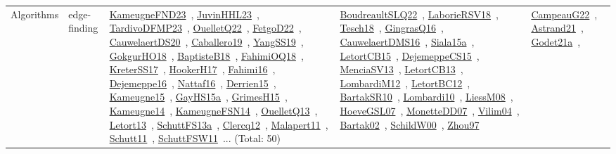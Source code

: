 {\begin{longtable}{lp{3cm}>{\raggedright\arraybackslash}p{6cm}>{\raggedright\arraybackslash}p{6cm}>{\raggedright\arraybackslash}p{8cm}}
Algorithms & edge-finding & \href{works/KameugneFND23.pdf}{KameugneFND23}~\cite{KameugneFND23}, \href{works/JuvinHHL23.pdf}{JuvinHHL23}~\cite{JuvinHHL23}, \href{works/TardivoDFMP23.pdf}{TardivoDFMP23}~\cite{TardivoDFMP23}, \href{works/OuelletQ22.pdf}{OuelletQ22}~\cite{OuelletQ22}, \href{works/FetgoD22.pdf}{FetgoD22}~\cite{FetgoD22}, \href{works/CauwelaertDS20.pdf}{CauwelaertDS20}~\cite{CauwelaertDS20}, \href{works/Caballero19.pdf}{Caballero19}~\cite{Caballero19}, \href{works/YangSS19.pdf}{YangSS19}~\cite{YangSS19}, \href{works/GokgurHO18.pdf}{GokgurHO18}~\cite{GokgurHO18}, \href{works/BaptisteB18.pdf}{BaptisteB18}~\cite{BaptisteB18}, \href{works/FahimiOQ18.pdf}{FahimiOQ18}~\cite{FahimiOQ18}, \href{works/KreterSS17.pdf}{KreterSS17}~\cite{KreterSS17}, \href{works/HookerH17.pdf}{HookerH17}~\cite{HookerH17}, \href{works/Fahimi16.pdf}{Fahimi16}~\cite{Fahimi16}, \href{works/Dejemeppe16.pdf}{Dejemeppe16}~\cite{Dejemeppe16}, \href{works/Nattaf16.pdf}{Nattaf16}~\cite{Nattaf16}, \href{works/Derrien15.pdf}{Derrien15}~\cite{Derrien15}, \href{works/Kameugne15.pdf}{Kameugne15}~\cite{Kameugne15}, \href{works/GayHS15a.pdf}{GayHS15a}~\cite{GayHS15a}, \href{works/GrimesH15.pdf}{GrimesH15}~\cite{GrimesH15}, \href{works/Kameugne14.pdf}{Kameugne14}~\cite{Kameugne14}, \href{works/KameugneFSN14.pdf}{KameugneFSN14}~\cite{KameugneFSN14}, \href{works/OuelletQ13.pdf}{OuelletQ13}~\cite{OuelletQ13}, \href{works/Letort13.pdf}{Letort13}~\cite{Letort13}, \href{works/SchuttFS13a.pdf}{SchuttFS13a}~\cite{SchuttFS13a}, \href{works/Clercq12.pdf}{Clercq12}~\cite{Clercq12}, \href{works/Malapert11.pdf}{Malapert11}~\cite{Malapert11}, \href{works/Schutt11.pdf}{Schutt11}~\cite{Schutt11}, \href{works/SchuttFSW11.pdf}{SchuttFSW11}~\cite{SchuttFSW11}... (Total: 50) & \href{works/BoudreaultSLQ22.pdf}{BoudreaultSLQ22}~\cite{BoudreaultSLQ22}, \href{works/LaborieRSV18.pdf}{LaborieRSV18}~\cite{LaborieRSV18}, \href{works/Tesch18.pdf}{Tesch18}~\cite{Tesch18}, \href{works/GingrasQ16.pdf}{GingrasQ16}~\cite{GingrasQ16}, \href{works/CauwelaertDMS16.pdf}{CauwelaertDMS16}~\cite{CauwelaertDMS16}, \href{works/Siala15a.pdf}{Siala15a}~\cite{Siala15a}, \href{works/LetortCB15.pdf}{LetortCB15}~\cite{LetortCB15}, \href{works/DejemeppeCS15.pdf}{DejemeppeCS15}~\cite{DejemeppeCS15}, \href{works/MenciaSV13.pdf}{MenciaSV13}~\cite{MenciaSV13}, \href{works/LetortCB13.pdf}{LetortCB13}~\cite{LetortCB13}, \href{works/LombardiM12.pdf}{LombardiM12}~\cite{LombardiM12}, \href{works/LetortBC12.pdf}{LetortBC12}~\cite{LetortBC12}, \href{works/BartakSR10.pdf}{BartakSR10}~\cite{BartakSR10}, \href{works/Lombardi10.pdf}{Lombardi10}~\cite{Lombardi10}, \href{works/LiessM08.pdf}{LiessM08}~\cite{LiessM08}, \href{works/HoeveGSL07.pdf}{HoeveGSL07}~\cite{HoeveGSL07}, \href{works/MonetteDD07.pdf}{MonetteDD07}~\cite{MonetteDD07}, \href{works/Vilim04.pdf}{Vilim04}~\cite{Vilim04}, \href{works/Bartak02.pdf}{Bartak02}~\cite{Bartak02}, \href{works/SchildW00.pdf}{SchildW00}~\cite{SchildW00}, \href{works/Zhou97.pdf}{Zhou97}~\cite{Zhou97} & \href{works/CampeauG22.pdf}{CampeauG22}~\cite{CampeauG22}, \href{works/Astrand21.pdf}{Astrand21}~\cite{Astrand21}, \href{works/Godet21a.pdf}{Godet21a}~\cite{Godet21a}, 
\end{longtable}}
